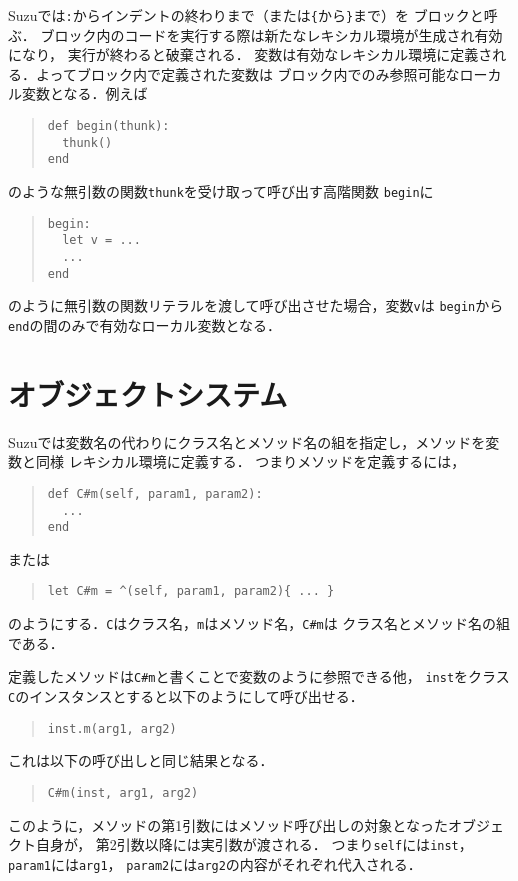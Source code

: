 \documentclass[a4paper,11pt,dvipdfmx]{jreport}
\begin{document}
Suzuでは\verb|:|からインデントの終わりまで（または\verb|{|から\verb|}|まで）を
ブロックと呼ぶ．
ブロック内のコードを実行する際は新たなレキシカル環境が生成され有効になり，
実行が終わると破棄される．
変数は有効なレキシカル環境に定義される．よってブロック内で定義された変数は
ブロック内でのみ参照可能なローカル変数となる．例えば
\begin{quote}
\begin{verbatim}
def begin(thunk):
  thunk()
end
\end{verbatim}
\end{quote}
のような無引数の関数\verb|thunk|を受け取って呼び出す高階関数
\verb|begin|に
\begin{quote}
\begin{verbatim}
begin:
  let v = ...
  ...
end
\end{verbatim}
\end{quote}
のように無引数の関数リテラルを渡して呼び出させた場合，変数\verb|v|は
\verb|begin|から\verb|end|の間のみで有効なローカル変数となる．

\section{オブジェクトシステム}

Suzuでは変数名の代わりにクラス名とメソッド名の組を指定し，メソッドを変数と同様
レキシカル環境に定義する．
つまりメソッドを定義するには，
\begin{quote}
\begin{verbatim}
def C#m(self, param1, param2):
  ...
end
\end{verbatim}
\end{quote}
または
\begin{quote}
\begin{verbatim}
let C#m = ^(self, param1, param2){ ... }
\end{verbatim}
\end{quote}
のようにする．\verb|C|はクラス名，\verb|m|はメソッド名，\verb|C#m|は
クラス名とメソッド名の組である．

定義したメソッドは\verb|C#m|と書くことで変数のように参照できる他，
\verb|inst|をクラス\verb|C|のインスタンスとすると以下のようにして呼び出せる．
\begin{quote}
\begin{verbatim}
inst.m(arg1, arg2)
\end{verbatim}
\end{quote}
これは以下の呼び出しと同じ結果となる．
\begin{quote}
\begin{verbatim}
C#m(inst, arg1, arg2)
\end{verbatim}
\end{quote}
このように，メソッドの第1引数にはメソッド呼び出しの対象となったオブジェクト自身が，
第2引数以降には実引数が渡される．
つまり\verb|self|には\verb|inst|，\verb|param1|には\verb|arg1|，
\verb|param2|には\verb|arg2|の内容がそれぞれ代入される．
\end{document}
